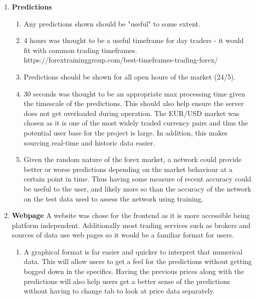         \begin{enumerate}
            \item \textbf{Predictions} 
            
            \begin{enumerate}
                \item Any predictions shown should be "useful" to some extent.

                \item 4 hours was thought to be a useful timeframe for day traders - it would fit with common trading timeframes. https://forextraininggroup.com/best-timeframes-trading-forex/
                
                \item Predictions should be shown for all open hours of the market (24/5).
                
                \item 30 seconds was thought to be an appropriate max processing time given the timescale of the predictions. This should also help ensure the server does not get overloaded during operation. The EUR/USD market was chosen as it is one of the most widely traded currency pairs and thus the potential user base for the project is large. In addition, this makes sourcing real-time and historic data easier.
                
                \item Given the random nature of the forex market, a network could provide better or worse predictions depending on the market behaviour at a certain point in time. Thus having some measure of recent accuracy could be useful to the user, and likely more so than the accuracy of the network on the test data used to assess the network using training.
            
            \end{enumerate}
    
            \item \textbf{Webpage} A website was chose for the frontend as it is more accessible being platform independent. Additionally most trading services such as brokers and sources of data use web pages so it would be a familiar format for users.
            
            \begin{enumerate}
                \item A graphical format is far easier and quicker to interpret that numerical data. This will allow users to get a feel for the predictions without getting bogged down in the specifics. Having the previous prices along with the predictions will also help users get a better sense of the predictions without having to change tab to look at price data separately.
                

\end{enumerate}
\end{enumerate}
